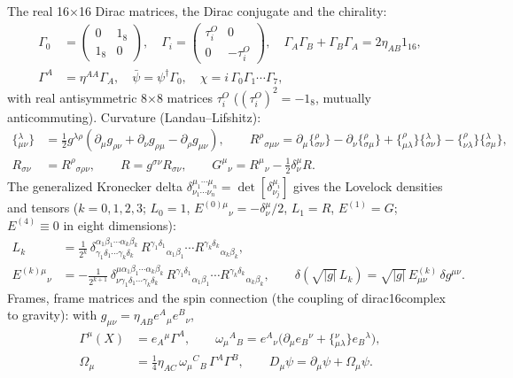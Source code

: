 \documentclass[10pt,a4paper]{article}
\begin{document}
The real 16×16 Dirac matrices, the Dirac conjugate and the chirality:
\begin{align*}
\Gamma_0&=\begin{pmatrix}0&1_8\\1_8&0\end{pmatrix},\quad \Gamma_i=\begin{pmatrix}\tau^O_i&0\\0&-\tau^O_i\end{pmatrix},\quad \Gamma_A\Gamma_B+\Gamma_B\Gamma_A=2\eta_{AB}1_{16}, \\
\Gamma^A&=\eta^{AA}\Gamma_A,\quad \bar\psi=\psi^\dagger\Gamma_0,\quad \chi=i\,\Gamma_0\Gamma_1\cdots\Gamma_7,
\end{align*}
with real antisymmetric 8×8 matrices $\tau^O_i$ ($(\tau^O_i)^2=-1_8$, mutually anticommuting). Curvature (Landau–Lifshitz):
\begin{align*}
\{{}^{\lambda}_{\mu\nu}\}&=\tfrac12g^{\lambda\rho}(\partial_\mu g_{\rho\nu}+\partial_\nu g_{\rho\mu}-\partial_\rho g_{\mu\nu}),\qquad R^\rho{}_{\sigma\mu\nu}=\partial_\mu\{{}^{\rho}_{\sigma\nu}\}-\partial_\nu\{{}^{\rho}_{\sigma\mu}\}+\{{}^{\rho}_{\mu\lambda}\}\{{}^{\lambda}_{\sigma\nu}\}-\{{}^{\rho}_{\nu\lambda}\}\{{}^{\lambda}_{\sigma\mu}\}, \\
R_{\sigma\nu}&=R^\rho{}_{\sigma\rho\nu},\qquad R=g^{\sigma\nu}R_{\sigma\nu},\qquad G^\mu{}_\nu=R^\mu{}_\nu-\tfrac12\delta^\mu_\nu R .
\end{align*}
The generalized Kronecker delta $\delta^{\mu_1\cdots\mu_n}_{\nu_1\cdots\nu_n}=\det[\delta^{\mu_i}_{\nu_j}]$ gives the Lovelock densities and tensors ($k=0,1,2,3$; $L_0=1$, $E^{(0)\mu}{}_\nu=-\delta^\mu_\nu/2$, $L_1=R$, $E^{(1)}=G$; $E^{(4)}\equiv0$ in eight dimensions):
\begin{align*}
L_k&=\frac1{2^k}\,\delta^{\alpha_1\beta_1\cdots\alpha_k\beta_k}_{\gamma_1\delta_1\cdots\gamma_k\delta_k}\,R^{\gamma_1\delta_1}{}_{\alpha_1\beta_1}\cdots R^{\gamma_k\delta_k}{}_{\alpha_k\beta_k}, \\
E^{(k)\mu}{}_\nu&=-\frac1{2^{k+1}}\,\delta^{\mu\alpha_1\beta_1\cdots\alpha_k\beta_k}_{\nu\gamma_1\delta_1\cdots\gamma_k\delta_k}\,R^{\gamma_1\delta_1}{}_{\alpha_1\beta_1}\cdots R^{\gamma_k\delta_k}{}_{\alpha_k\beta_k},\qquad \delta\!\left(\sqrt{|g|}\,L_k\right)=\sqrt{|g|}\,E^{(k)}_{\mu\nu}\,\delta g^{\mu\nu}.
\end{align*}
Frames, frame matrices and the spin connection (the coupling of dirac16complex to gravity): with $g_{\mu\nu}=\eta_{AB}e^A{}_\mu e^B{}_\nu$,
\begin{align*}
\Gamma^\mu(X)&=e_A{}^\mu\Gamma^A,\qquad \omega_\mu{}^A{}_B=e^A{}_\nu\big(\partial_\mu e_B{}^\nu+\{{}^{\nu}_{\mu\lambda}\}e_B{}^\lambda\big), \\
\Omega_\mu&=\tfrac14\eta_{AC}\,\omega_\mu{}^C{}_B\,\Gamma^A\Gamma^B,\qquad D_\mu\psi=\partial_\mu\psi+\Omega_\mu\psi .
\end{align*}
\end{document}
